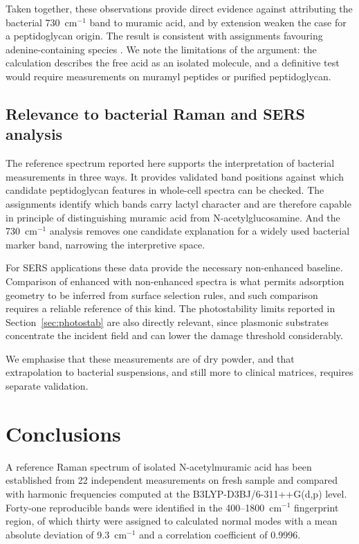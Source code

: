 \documentclass[11pt,a4paper]{article}
\newcommand{\wn}{\ensuremath{\mathrm{cm}^{-1}}}
\begin{document}
Taken together, these observations provide direct evidence against attributing
the bacterial 730~\wn{} band to muramic acid, and by extension weaken the case
for a peptidoglycan origin. The result is consistent with assignments favouring
adenine-containing species \cite{premasiri2016origins, kubryk2016origin}. We
note the limitations of the argument: the calculation describes the free acid as
an isolated molecule, and a definitive test would require measurements on
muramyl peptides or purified peptidoglycan.

\subsection{Relevance to bacterial Raman and SERS analysis}

The reference spectrum reported here supports the interpretation of bacterial
measurements in three ways. It provides validated band positions against which
candidate peptidoglycan features in whole-cell spectra can be checked. The
assignments identify which bands carry lactyl character and are therefore
capable in principle of distinguishing muramic acid from N-acetylglucosamine.
And the 730~\wn{} analysis removes one candidate explanation for a widely used
bacterial marker band, narrowing the interpretive space.

For SERS applications these data provide the necessary non-enhanced baseline.
Comparison of enhanced with non-enhanced spectra is what permits adsorption
geometry to be inferred from surface selection rules, and such comparison
requires a reliable reference of this kind. The photostability limits reported
in Section~\ref{sec:photostab} are also directly relevant, since plasmonic
substrates concentrate the incident field and can lower the damage threshold
considerably.

We emphasise that these measurements are of dry powder, and that extrapolation
to bacterial suspensions, and still more to clinical matrices, requires separate
validation.

\section{Conclusions}

A reference Raman spectrum of isolated N-acetylmuramic acid has been established
from 22 independent measurements on fresh sample and compared with harmonic
frequencies computed at the B3LYP-D3BJ/6-311++G(d,p) level. Forty-one
reproducible bands were identified in the 400--1800~\wn{} fingerprint region, of
which thirty were assigned to calculated normal modes with a mean absolute
deviation of 9.3~\wn{} and a correlation coefficient of 0.9996.
\end{document}

